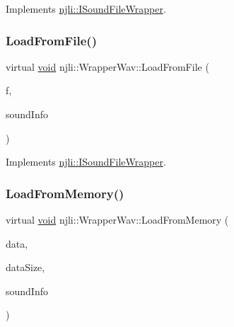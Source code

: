 Implements \mbox{\hyperlink{classnjli_1_1_i_sound_file_wrapper_a1b22318560969f7cc06ac03dcb78971f}{njli\+::\+I\+Sound\+File\+Wrapper}}.

\mbox{\label{classnjli_1_1_wrapper_wav_a43b8306e554b224968ef436020416765}} 
\subsubsection{\texorpdfstring{Load\+From\+File()}{LoadFromFile()}}
{\footnotesize\ttfamily virtual \mbox{\hyperlink{_thread_8h_af1e856da2e658414cb2456cb6f7ebc66}{void}} njli\+::\+Wrapper\+Wav\+::\+Load\+From\+File (\begin{DoxyParamCaption}\item[{F\+I\+LE $\ast$}]{f,  }\item[{Sound\+Info $\ast$}]{sound\+Info }\end{DoxyParamCaption})\hspace{0.3cm}{\ttfamily [virtual]}}



Implements \mbox{\hyperlink{classnjli_1_1_i_sound_file_wrapper_a525f86e4bbe65d5b90ee3eda171b5492}{njli\+::\+I\+Sound\+File\+Wrapper}}.

\mbox{\label{classnjli_1_1_wrapper_wav_a93b83be038f6d2bc269720b0fa91d841}} 
\subsubsection{\texorpdfstring{Load\+From\+Memory()}{LoadFromMemory()}}
{\footnotesize\ttfamily virtual \mbox{\hyperlink{_thread_8h_af1e856da2e658414cb2456cb6f7ebc66}{void}} njli\+::\+Wrapper\+Wav\+::\+Load\+From\+Memory (\begin{DoxyParamCaption}\item[{char $\ast$}]{data,  }\item[{int}]{data\+Size,  }\item[{Sound\+Info $\ast$}]{sound\+Info }\end{DoxyParamCaption})\hspace{0.3cm}{\ttfamily [virtual]}}



